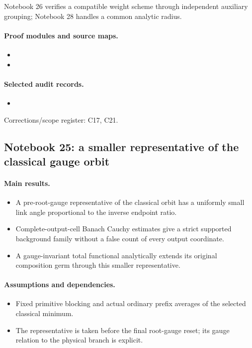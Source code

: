 Notebook 26 verifies a compatible weight scheme through independent auxiliary grouping; Notebook 28 handles a common analytic radius.

\paragraph{Proof modules and source maps.}
\begingroup\small
\begin{itemize}
\item {}
\item {}
\end{itemize}
\endgroup

\paragraph{Selected audit records.}
\begingroup\small
\begin{itemize}
\item {}
\end{itemize}
\endgroup
Corrections/scope register: C17, C21.\par

\subsection{Notebook 25: a smaller representative of the classical gauge orbit}
\label{hnc-25}
\noindent{}\par

\paragraph{Main results.}
\begin{itemize}
\item A pre-root-gauge representative of the classical orbit has a uniformly small link angle proportional to the inverse endpoint ratio.
\item Complete-output-cell Banach Cauchy estimates give a strict supported background family without a false count of every output coordinate.
\item A gauge-invariant total functional analytically extends its original composition germ through this smaller representative.
\end{itemize}

\paragraph{Assumptions and dependencies.}
\begin{itemize}
\item Fixed primitive blocking and actual ordinary prefix averages of the selected classical minimum.
\item The representative is taken before the final root-gauge reset; its gauge relation to the physical branch is explicit.
\end{itemize}

